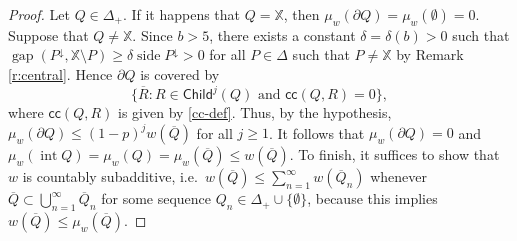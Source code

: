 \documentclass[12pt]{amsart}
\theoremstyle{definition}
\theoremstyle{remark}
\newcommand{\XX}{\mathbb{X}}
\newcommand{\interior}{\mathop\mathrm{int}\nolimits}
\newcommand{\side}{\mathop\mathrm{side}\nolimits}
\newcommand{\gap}{\mathop\mathrm{gap}\nolimits}
\newcommand{\Child}{\mathsf{Child}}
\numberwithin{figure}{section}
\numberwithin{equation}{section}
\begin{document}
\begin{proof} Let $Q\in\Delta_+$. If it happens that $Q=\XX$, then $\mu_w(\partial Q)=\mu_w(\emptyset)=0$. Suppose that $Q\neq\XX$. Since $b>5$, there exists a constant $\delta=\delta(b)>0$ such that $\gap(P^\downarrow,\XX\setminus P)\geq \delta \side P^\downarrow >0$ for all $P\in\Delta$ such that $P\neq\XX$ by Remark \ref{r:central}. Hence $\partial Q$ is covered by $$\{\overline{R}:R\in\Child^j(Q)\text{ and } \mathsf{cc}(Q,R)=0\},$$ where $\mathsf{cc}(Q,R)$ is given by \eqref{cc-def}. Thus, by the hypothesis, $\mu_w(\partial Q)\leq (1-p)^j w(\overline{Q})$ for all $j\geq 1$. It follows that $\mu_w(\partial Q)=0$ and $\mu_w(\interior{Q})=\mu_w(Q)=\mu_w(\overline{Q})\leq w(\overline{Q})$. To finish, it suffices to show that $w$ is countably subadditive, i.e.~$w(\overline{Q})\leq \sum_{n=1}^\infty w(\overline{Q}_n)$ whenever $\overline{Q}\subset\bigcup_{n=1}^\infty \overline{Q}_n$ for some sequence $Q_n\in\Delta_+\cup\{\emptyset\}$, because this implies $w(\overline{Q})\leq \mu_w(\overline{Q})$.


\end{proof}
\end{document}
